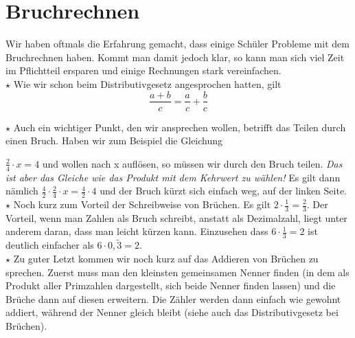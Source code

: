 \section{Bruchrechnen}
	Wir haben oftmals die Erfahrung gemacht, dass einige Schüler Probleme mit dem
	Bruchrechnen haben. Kommt man damit jedoch klar, so kann man sich viel Zeit im
	Pflichtteil ersparen und einige Rechnungen stark vereinfachen. \\
	
	\(\star\) Wie wir schon beim Distributivgesetz angesprochen hatten, gilt
	\[\frac{a+b}{c}=\frac{a}{c}+\frac{b}{c}\]
	
	\(\star\) Auch ein wichtiger Punkt, den wir ansprechen wollen, betrifft das
	Teilen durch einen Bruch. Haben wir zum Beispiel die Gleichung
	
	\(\frac{2}{4}\cdot x=4\) und wollen nach x auflösen, so müssen wir durch den
	Bruch teilen. \emph{Das ist aber das Gleiche wie das Produkt mit dem Kehrwert
	zu wählen!} Es gilt dann nämlich \(\frac{4}{2}\cdot \frac{2}{4}\cdot
	x=\frac{4}{2}\cdot 4\) und der Bruch kürzt sich einfach weg, auf der linken
	Seite.\\
	
	\(\star\) Noch kurz zum Vorteil der Schreibweise von Brüchen. Es gilt \(2\cdot
	\frac{1}{3}=\frac{2}{3}\). Der Vorteil, wenn man Zahlen als Bruch schreibt,
	anstatt als Dezimalzahl, liegt unter anderem daran, dass man leicht kürzen
	kann. Einzusehen dass \(6\cdot \frac{1}{3}=2\) ist deutlich einfacher als
	\(6\cdot 0,\widetilde{3}=2\).\\
	
	\(\star\) Zu guter Letzt kommen wir noch kurz auf das Addieren von Brüchen zu
	sprechen. Zuerst muss man den kleinsten gemeinsamen Nenner finden (in dem als
	Produkt aller Primzahlen dargestellt, sich beide Nenner finden lassen) und die
	Brüche dann auf diesen erweitern. Die Zähler werden dann einfach wie gewohnt
	addiert, während der Nenner gleich bleibt (siehe auch das Distributivgesetz bei
	Brüchen).
